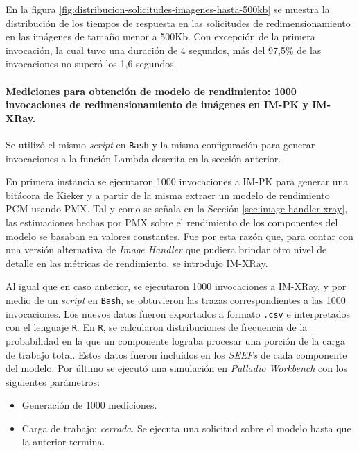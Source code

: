 En la figura \ref{fig:distribucion-solicitudes-imagenes-hasta-500kb} se muestra la distribución de los tiempos de respuesta en las solicitudes de redimensionamiento en las imágenes de tamaño menor a 500Kb. Con excepción de la primera invocación, la cual tuvo una duración de 4 segundos, más del 97,5\% de las invocaciones no superó los 1,6 segundos.

\paragraph{Mediciones para obtención de modelo de rendimiento: 1000 invocaciones de redimensionamiento de imágenes en IM-PK y IM-XRay.} Se utilizó el mismo \emph{script} en \texttt{Bash} y la misma configuración para generar invocaciones a la función Lambda descrita en la sección anterior.

En primera instancia se ejecutaron 1000 invocaciones a IM-PK para generar una bitácora de Kieker y a partir de la misma extraer un modelo de rendimiento PCM usando PMX. Tal y como se señala en la Sección \ref{sec:image-handler-xray}, las estimaciones hechas por PMX sobre el rendimiento de los componentes del modelo se basaban en valores constantes. Fue por esta razón que, para contar con una versión alternativa de \emph{Image Handler} que pudiera brindar otro nivel de detalle en las  métricas de rendimiento, se introdujo IM-XRay.

Al igual que en caso anterior, se ejecutaron 1000 invocaciones a IM-XRay, y por medio de un \emph{script} en \texttt{Bash}, se obtuvieron las trazas correspondientes a las 1000 invocaciones. Los nuevos datos fueron exportados a formato \texttt{.csv} e interpretados con el lenguaje \texttt{R}. En \texttt{R}, se calcularon distribuciones de frecuencia de la probabilidad en la que un componente lograba procesar una porción de la carga de trabajo total. Estos datos fueron incluidos en los \emph{SEEFs} de cada componente del modelo. Por último se ejecutó una simulación en \emph{Palladio Workbench} con los siguientes parámetros:
\begin{itemize}
    \item Generación de 1000 mediciones.
    \item Carga de trabajo: \emph{cerrada}. Se ejecuta una solicitud sobre el modelo hasta que la anterior termina. 
\end{itemize}

